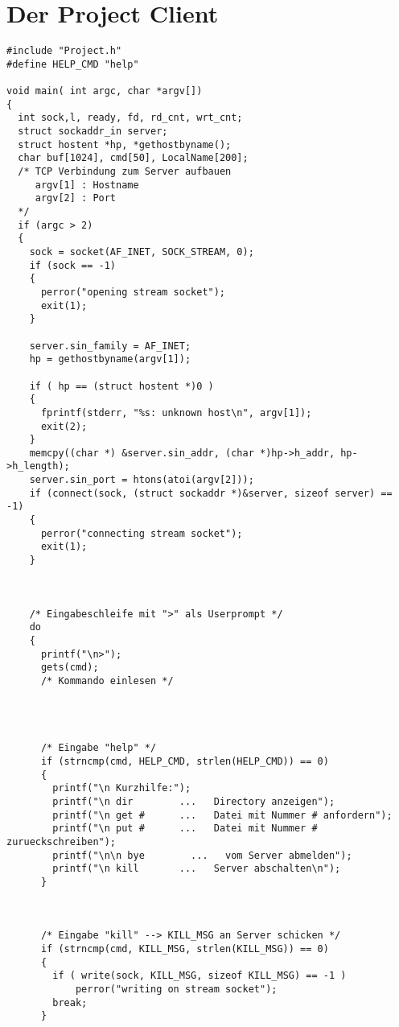 \pagebreak

\section{Der Project Client}
  
\vspace{3mm}  
\begin{verbatim}
#include "Project.h"
#define HELP_CMD "help"
 
void main( int argc, char *argv[])
{
  int sock,l, ready, fd, rd_cnt, wrt_cnt;
  struct sockaddr_in server;
  struct hostent *hp, *gethostbyname();
  char buf[1024], cmd[50], LocalName[200];
  /* TCP Verbindung zum Server aufbauen 
     argv[1] : Hostname 
     argv[2] : Port
  */
  if (argc > 2)
  {
    sock = socket(AF_INET, SOCK_STREAM, 0);
    if (sock == -1)
    {
      perror("opening stream socket");
      exit(1);
    }

    server.sin_family = AF_INET; 
    hp = gethostbyname(argv[1]);

    if ( hp == (struct hostent *)0 )
    {
      fprintf(stderr, "%s: unknown host\n", argv[1]);
      exit(2);
    }
    memcpy((char *) &server.sin_addr, (char *)hp->h_addr, hp->h_length);
    server.sin_port = htons(atoi(argv[2]));
    if (connect(sock, (struct sockaddr *)&server, sizeof server) == -1)
    {
      perror("connecting stream socket");
      exit(1);
    }


 
    /* Eingabeschleife mit ">" als Userprompt */
    do
    {
      printf("\n>");
      gets(cmd);
      /* Kommando einlesen */
 


     
      /* Eingabe "help" */
      if (strncmp(cmd, HELP_CMD, strlen(HELP_CMD)) == 0)
      {
        printf("\n Kurzhilfe:");
        printf("\n dir        ...   Directory anzeigen");
        printf("\n get #      ...   Datei mit Nummer # anfordern");
        printf("\n put #      ...   Datei mit Nummer # zurueckschreiben");
        printf("\n\n bye        ...   vom Server abmelden");
        printf("\n kill       ...   Server abschalten\n");
      }


 
      /* Eingabe "kill" --> KILL_MSG an Server schicken */
      if (strncmp(cmd, KILL_MSG, strlen(KILL_MSG)) == 0)
      {
        if ( write(sock, KILL_MSG, sizeof KILL_MSG) == -1 )
            perror("writing on stream socket");
        break;
      }




\end{verbatim}
